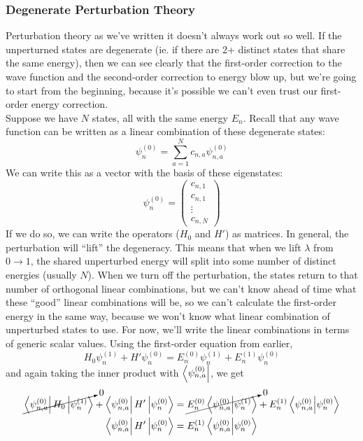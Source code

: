 \documentclass[a4paper]{article}
\begin{document}
\subsubsection{Degenerate Perturbation Theory}
Perturbation theory as we've written it doesn't always work out so well. If
the unperturned states are degenerate (ie. if there are 2+ distinct states that
share the same energy), then we can see clearly that the first-order correction
to the wave function and the second-order correction to energy blow up, but
we're going to start from the beginning, because it's possible we can't even
trust our first-order energy correction.\\
Suppose we have $N$ states, all with the same energy $E_n$. Recall that any
wave function can be written as a linear combination of these degenerate
states:
\[ \psi_n^{(0)} = \sum_{a=1}^N c_{n,a}\psi_{n,a}^{(0)} \]
We can write this as a vector with the basis of these eigenstates:
\[
	\psi_n^{(0)} =
	\begin{pmatrix}
		c_{n,1}\\
		c_{n,1}\\
		\vdots\\
		c_{n,N}
	\end{pmatrix}
\]
If we do so, we can write the operators ($H_0$ and $H'$) as matrices.
In general, the perturbation will ``lift'' the degeneracy. This means that
when we lift $\lambda$ from $0\to1$, the shared unperturbed energy will split
into some number of distinct energies (usually $N$). When we turn off the
perturbation, the states return to that number of orthogonal linear
combinations, but we can't know ahead of time what these ``good'' linear
combinations will be, so we can't calculate the first-order energy in the
same way, because we won't know what linear combination of unperturbed states
to use. For now, we'll write the linear combinations in terms of generic
scalar values. Using the first-order equation from earlier,
\[
	H_0\psi_n^{(1)} + H'\psi_n^{(0)} =
		E_n^{(0)}\psi_n^{(1)} + E_n^{(1)}\psi_n^{(0)}
\]
and again taking the inner product with $\left\langle \psi_{n,a}^{(0)} \right\rvert$, we get
\begin{align*}
	\cancelto{0}{
	\left\langle \psi_{n,a}^{(0)} \right\rvert H_0\left\lvert \psi_{n}^{(1)}\right\rangle} +
	\left\langle \psi_{n,a}^{(0)} \right\rvert H' \left\lvert \psi_{n}^{(0)}\right\rangle &=
	\cancelto{0}{
	E_n^{(0)}\left\langle \psi_{n,a}^{(0)}\middle\vert \psi_{n}^{(1)} \right\rangle} +
	E_n^{(1)}\left\langle \psi_{n,a}^{(0)}\middle\vert \psi_{n}^{(0)} \right\rangle\\
	\left\langle \psi_{n,a}^{(0)} \right\rvert H'\left\lvert \psi_{n}^{(0)}\right\rangle &=
	E_n^{(1)}\left\langle \psi_{n,a}^{(0)}\middle\vert \psi_n^{(0)} \right\rangle\\
\end{align*}
\end{document}
